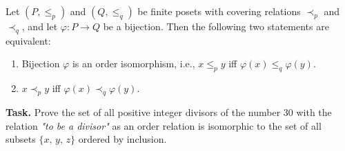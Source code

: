 \documentclass[14pt,a4paper]{extarticle}
\begin{document}
	 \begin{theorem}
	 	Let $(P,\leq_p)$ and $(Q,\leq_q)$ be finite posets with covering relations $\prec_p$ and $\prec_q$, and let $\varphi : P \rightarrow Q$ be a bijection. Then the following two statements are equivalent: 
	 	\begin{enumerate}
	 	\item Bijection $\varphi$ is an order isomorphism, i.e., $x\leq_p y$ iff $\varphi(x) \leq_q \varphi(y)$. 
	 	\item $x \prec_p y$ iff $\varphi(x) \prec_q \varphi(y)$.
	 	\end{enumerate}
	 \end{theorem}
	 
	 \noindent\textbf{Task.} Prove the set of all positive integer divisors of the number 30 with the relation \textit{"to be a divisor"} as an order relation is isomorphic to the set of all subsets $\{x,\, y,\, z\}$ ordered by inclusion.\\
	 
\end{document}
